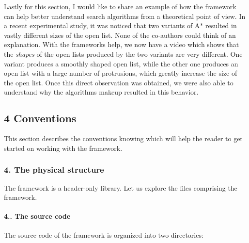 Lastly for this section, I would like to share an example of how the framework can help better understand search algorithms from a theoretical point of view. In a recent experimental study, it was noticed that two variants of A$\ast$ resulted in vastly different sizes of the open list. None of the co-\/authors could think of an explanation. With the framework\textquotesingle{}s help, we now have a video which shows that the {\itshape shapes} of the open lists produced by the two variants are very different. One variant produces a smoothly shaped open list, while the other one produces an open list with a large number of protrusions, which greatly increase the size of the open list. Once this direct observation was obtained, we were also able to understand why the algorithms\textquotesingle{} makeup resulted in this behavior.\hypertarget{index_s-concepts}{}\subsection{4 Conventions}\label{index_s-concepts}
This section describes the conventions knowing which will help the reader to get started on working with the framework.\hypertarget{index_s-physical}{}\subsubsection{4. The physical structure}\label{index_s-physical}
The framework is a header-\/only library. Let us explore the files comprising the framework.\hypertarget{index_s-source}{}\paragraph{4.. The source code}\label{index_s-source}
The source code of the framework is organized into two directories\+:
